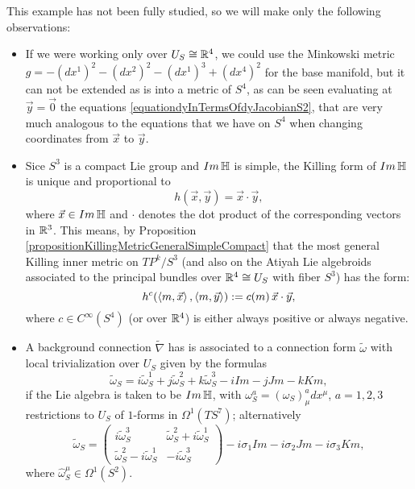 This example has not been fully studied, so we will make only the following observations:
\begin{itemize}
    \item If we were working only over $U_S \cong \mathbb{R}^4$, we could use the Minkowski metric $g = -(dx^1)^2 -(dx^2)^2-(dx^1)^3+(dx^4)^2$ for the base manifold, but it can not be extended as is into a metric of $S^4$, as can be seen evaluating at $\vec y = \vec 0$ the equations \eqref{equationdyInTermsOfdyJacobianS2}, that are very much analogous to the equations that we have on $S^4$ when changing coordinates from $\vec x$ to $\vec y$.
    
    \item Sice $S^3$ is a compact Lie group and $Im\operatorname{\mathbb{H}}$ is simple, the Killing form of $Im\operatorname{\mathbb{H}}$ is unique and proportional to 
    \begin{equation*}
        h(\vec x, \vec y) = \vec x \cdot \vec y,
    \end{equation*} where $\vec x \in Im \operatorname{\mathbb{H}}$ and $\cdot$ denotes the dot product of the corresponding vectors in $\mathbb{R}^3$. This means, by Proposition \ref{propositionKillingMetricGeneralSimpleCompact} that the most general Killing inner metric on $TP^k/S^3$ (and also on the Atiyah Lie algebroids associated to the principal bundles over $\mathbb{R}^4 \cong U_S$ with fiber $S^3$) has the form:
    \begin{equation}\label{equationKIllingMetricTPkS2}
        h^c(\left\langle m, \vec x \right\rangle, \left\langle m, \vec y \right\rangle) := c(m)\,\vec x \cdot \vec y,
    \end{equation}
    where $c \in C^\infty(S^4)$ (or over $\mathbb{R}^4$) is either always positive or always negative.
    
    \item A background connection $\tilde \nabla$ has is associated to a connection form $\tilde \omega$ with local trivialization over $U_S$ given by the formulas
        \begin{equation}
        \tilde \omega_S = i \tilde \omega_S^1 + j \tilde \omega_S^2 + k \tilde \omega_S^3 - iIm - jJm - kKm,
        \end{equation}
    if the Lie algebra is taken to be $Im\operatorname{\mathbb{H}}$, with $\omega_S^a = (\omega_S)^a_\mu dx^\mu$, $a = 1, 2, 3$ restrictions to $U_S$ of $1$-forms in $\Omega^1(TS^7)$; alternatively 
        \begin{equation}
         \tilde \omega_S =   \begin{pmatrix} i\tilde \omega_S^3 & \tilde \omega_S^2 + i \tilde \omega_S^1 \\ \tilde \omega_S^2 - i \tilde \omega_S^1 & -i\tilde \omega_S^3  \end{pmatrix} - i \sigma_1 Im - i \sigma_2 Jm - i \sigma_3 Km,
        \end{equation}
        where $\hat \omega_S^\mu \in \Omega^1(S^2)$.
        
\end{itemize}